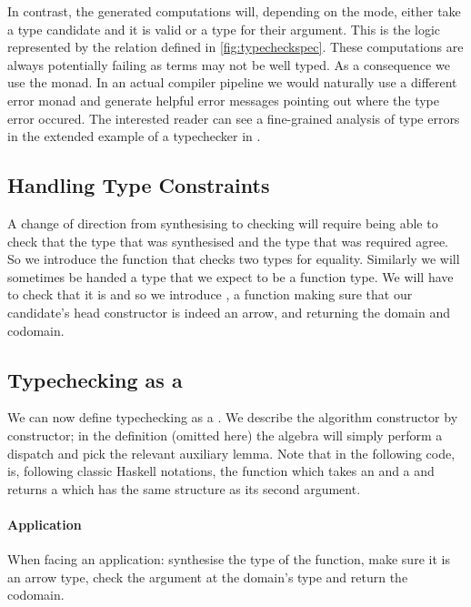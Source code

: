 In contrast, the generated computations will, depending on the mode,
either take a type candidate and  it is valid or 
a type for their argument. This is the logic represented by the 
relation defined in \cref{fig:typecheckspec}.
%
These computations are always potentially failing as terms may not be
well typed. As a consequence we use the  monad. In an actual
compiler pipeline we would naturally use a different error monad and
generate helpful error messages pointing out where the type error occured.
The interested reader can see a fine-grained analysis of type errors
in the extended example of a typechecker in
\citet{DBLP:journals/jfp/McBrideM04}.

\subsection{Handling Type Constraints}

A change of direction from synthesising to checking will require being
able to check that the type that was synthesised and the type that was
required agree. So we introduce the function  that checks
two types for equality.
%
Similarly we will sometimes be handed a type that we expect to be a
function type. We will have to check that it is and so we introduce
, a function making sure that our candidate's head
constructor is indeed an arrow, and returning the domain and codomain.



\subsection{Typechecking as a }

We can now define typechecking as a \semrec{}. We describe the
algorithm constructor by constructor; in the 
definition (omitted here) the algebra will simply perform a
dispatch and pick the relevant auxiliary lemma. Note that in the
following code, \AF{\_<\$\_} is, following classic Haskell notations,
the function which takes an  and a { } and
returns a { }
which has the same structure as its second argument.

\paragraph{Application} When facing an application: synthesise the type of the
function, make sure it is an arrow type, check the argument at the domain's
type and return the codomain.
\begin{agdasnippet}
\end{agdasnippet}
%
